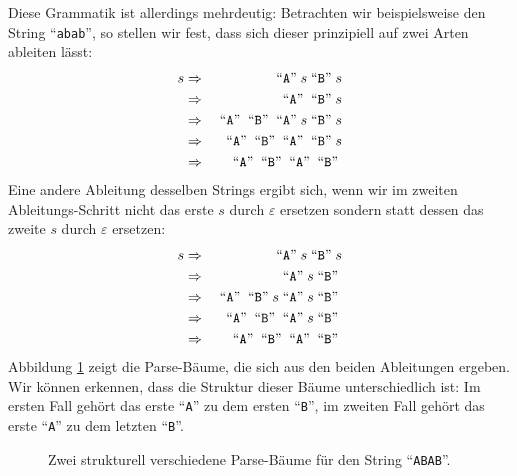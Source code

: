 Diese Grammatik ist allerdings mehrdeutig: Betrachten wir beispielsweise den String 
``\texttt{abab}'', so stellen wir fest, dass sich dieser prinzipiell auf zwei Arten ableiten l\"asst:
\begin{eqnarray*}
  s & \Rightarrow &\;\mbox{``\texttt{A}''}\; s \;\mbox{``\texttt{B}''}\; s                       \\
    & \Rightarrow &\;\mbox{``\texttt{A}''}\; \;\mbox{``\texttt{B}''}\; s                         \\
    & \Rightarrow &\;\mbox{``\texttt{A}''}\; \;\mbox{``\texttt{B}''}\;\;\mbox{``\texttt{A}''}\; s \;\mbox{``\texttt{B}''}\; s \\
    & \Rightarrow &\;\mbox{``\texttt{A}''}\; \;\mbox{``\texttt{B}''}\;\;\mbox{``\texttt{A}''}\; \;\mbox{``\texttt{B}''}\; s   \\
    & \Rightarrow &\;\mbox{``\texttt{A}''}\; \;\mbox{``\texttt{B}''}\;\;\mbox{``\texttt{A}''}\; \;\mbox{``\texttt{B}''}\; 
\end{eqnarray*}
Eine andere Ableitung desselben Strings ergibt sich, wenn wir im zweiten Ableitungs-Schritt nicht das erste
$s$ durch $\varepsilon$ ersetzen sondern statt dessen das zweite $s$ durch $\varepsilon$ ersetzen:
\begin{eqnarray*}
  s & \Rightarrow &\;\mbox{``\texttt{A}''}\; s \;\mbox{``\texttt{B}''}\; s                       \\
    & \Rightarrow &\;\mbox{``\texttt{A}''}\; s \;\mbox{``\texttt{B}''}\;                         \\
    & \Rightarrow &\;\mbox{``\texttt{A}''}\; \;\mbox{``\texttt{B}''}\; s\;\mbox{``\texttt{A}''}\; s \;\mbox{``\texttt{B}''}\; \\
    & \Rightarrow &\;\mbox{``\texttt{A}''}\; \;\mbox{``\texttt{B}''}\;\;\mbox{``\texttt{A}''}\; s \;\mbox{``\texttt{B}''}\;   \\
    & \Rightarrow &\;\mbox{``\texttt{A}''}\; \;\mbox{``\texttt{B}''}\;\;\mbox{``\texttt{A}''}\; \;\mbox{``\texttt{B}''}\;     \\
\end{eqnarray*}
Abbildung \ref{fig:ambiguous-a.dot} zeigt die Parse-B\"aume, die sich aus den beiden Ableitungen ergeben.
Wir k\"onnen erkennen, dass die Struktur dieser B\"aume unterschiedlich ist:  Im ersten Fall geh\"ort das erste
``\texttt{A}'' zu dem ersten ``\texttt{B}'', im zweiten Fall geh\"ort das erste ``\texttt{A}'' zu dem letzten
``\texttt{B}''.

\begin{figure}[!ht]
\quad
  \caption{Zwei strukturell verschiedene Parse-B\"aume f\"ur den String ``\texttt{ABAB}''.}
  \label{fig:ambiguous-a.dot}
\end{figure}

